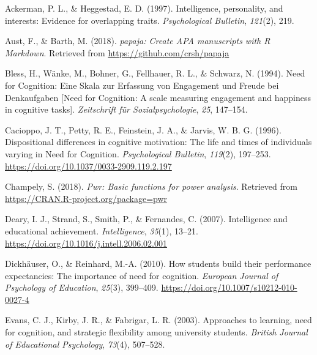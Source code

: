 \documentclass[
  man]{apa6}
\newlength{\cslhangindent}
\newlength{\cslentryspacingunit} %
\newenvironment{CSLReferences}[2] %
 {%
  \setlength{\parindent}{0pt}
  \ifodd #1
  \let\oldpar\par
  \def\par{\hangindent=\cslhangindent\oldpar}
  \fi
  \setlength{\parskip}{#2\cslentryspacingunit}
 }%
 {}
\begin{document}
\hypertarget{refs}{}
\begin{CSLReferences}{1}{0}
\leavevmode{}%
Ackerman, P. L., \& Heggestad, E. D. (1997). Intelligence, personality, and interests: Evidence for overlapping traits. \emph{Psychological Bulletin}, \emph{121}(2), 219.

\leavevmode{}%
Aust, F., \& Barth, M. (2018). \emph{{papaja}: {Create} {APA} manuscripts with {R Markdown}}. Retrieved from \url{https://github.com/crsh/papaja}

\leavevmode{}%
Bless, H., Wänke, M., Bohner, G., Fellhauer, R. L., \& Schwarz, N. (1994). Need for {C}ognition: {E}ine {S}kala zur {E}rfassung von {E}ngagement und {F}reude bei {D}enkaufgaben {[}{N}eed for {C}ognition: A scale measuring engagement and happiness in cognitive tasks{]}. \emph{Zeitschrift {f}{ü}r Sozialpsychologie}, \emph{25}, 147--154.

\leavevmode{}%
Cacioppo, J. T., Petty, R. E., Feinstein, J. A., \& Jarvis, W. B. G. (1996). Dispositional differences in cognitive motivation: The life and times of individuals varying in {N}eed for {C}ognition. \emph{Psychological Bulletin}, \emph{119}(2), 197--253. \url{https://doi.org/10.1037/0033-2909.119.2.197}

\leavevmode{}%
Champely, S. (2018). \emph{Pwr: Basic functions for power analysis}. Retrieved from \url{https://CRAN.R-project.org/package=pwr}

\leavevmode{}%
Deary, I. J., Strand, S., Smith, P., \& Fernandes, C. (2007). Intelligence and educational achievement. \emph{Intelligence}, \emph{35}(1), 13--21. \url{https://doi.org/10.1016/j.intell.2006.02.001}

\leavevmode{}%
Dickhäuser, O., \& Reinhard, M.-A. (2010). How students build their performance expectancies: The importance of need for cognition. \emph{European Journal of Psychology of Education}, \emph{25}(3), 399--409. \url{https://doi.org/10.1007/s10212-010-0027-4}

\leavevmode{}%
Evans, C. J., Kirby, J. R., \& Fabrigar, L. R. (2003). Approaches to learning, need for cognition, and strategic flexibility among university students. \emph{British Journal of Educational Psychology}, \emph{73}(4), 507--528.


\end{CSLReferences}
\end{document}
